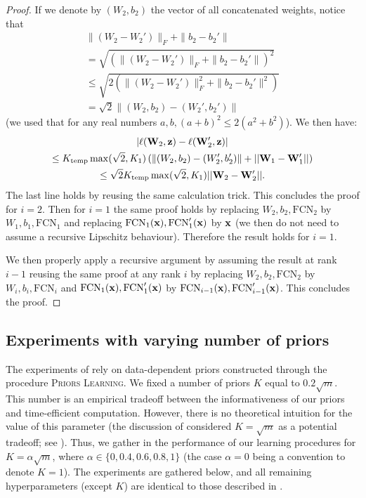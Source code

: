 \begin{noaddcontents}
\begin{proof}
        If we denote by $(W_2,b_2)$ the vector of all concatenated weights, notice that 
        \begin{multline*}
            \|(W_2- W_2')\|_F + \|b_2-b_2'\| \\= \sqrt{(\|(W_2- W_2')\|_F + \|b_2-b_2'\|)^2} \\
            \le \sqrt{2(\|(W_2- W_2')\|_F^2 + \|b_2-b_2'\|^2)} \\
            = \sqrt{2}\|(W_2,b_2)-(W_2',b_2')\|
        \end{multline*} (we used that for any real numbers $a,b, (a+b)^2\le 2(a^2 + b^2)$). We then have: 
        \begin{multline*}
             |\ell(\mathbf{W}_2, \mathbf{z}) - \ell(\mathbf{W}'_2, \mathbf{z}) | \\
             \le K_{\text{temp}} \max(\sqrt{2},K_1) \left( \|(W_2,b_2)-(W_2',b_2')\| + ||\mathbf{W}_1- \mathbf{W}_1'|| \right) \\
              \le \sqrt{2} K_{\text{temp}} \max(\sqrt{2},K_1) ||\mathbf{W}_2- \mathbf{W}_2'||.
         \end{multline*} 
        The last line holds by reusing the same calculation trick. This concludes the proof for $i=2$. Then for $i=1$ the same proof holds by replacing $W_2, b_2, \text{FCN}_2$ by $W_1, b_1, \text{FCN}_1$ and replacing $\text{FCN}_1(\mathbf{x}),  \text{FCN}_1'(\mathbf{x})$ by $\mathbf{x}$ (we then do not need to assume a recursive Lipschitz behaviour). Therefore the result holds for $i=1$. 
    
        We then properly apply a recursive argument by assuming the result at rank $i-1$ reusing the same proof at any rank $i$ by replacing $W_2, b_2, \text{FCN}_2$ by $W_i, b_i, \text{FCN}_i$ and $\text{FCN}_1(\mathbf{x}), \text{FCN}_1'(\mathbf{x})$ by $\text{FCN}_{i-1}(\mathbf{x}), \text{FCN}_{i-1}'(\mathbf{x})$. This concludes the proof.
    \end{proof}
    
    \subsection{Experiments with varying number of priors}
    \label{sec:experiments-supp}
    
    The experiments of  rely on data-dependent priors constructed through the procedure \textsc{Priors Learning}.
    We fixed a number of priors $K$ equal to $0.2\sqrt{m}$.
    This number is an empirical tradeoff between the informativeness of our priors and time-efficient computation.
    However, there is no theoretical intuition for the value of this parameter (the discussion of  considered $K=\sqrt{m}$ as a potential tradeoff; see ). 
    Thus, we gather in the performance of our learning procedures for $K=\alpha\sqrt{m}$, where $\alpha\in\{0,0.4,0.6,0.8,1\}$ (the case $\alpha =0$ being a convention to denote $K=1$).
    The experiments are gathered below, and all remaining hyperparameters (except $K$) are identical to those described in .
    

\end{noaddcontents}

